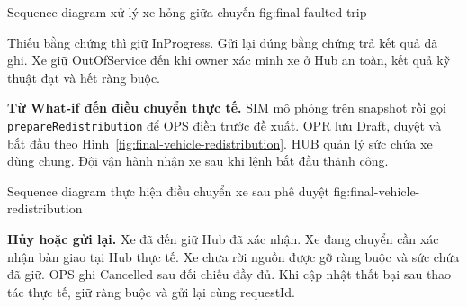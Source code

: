  {Sequence diagram xử lý xe hỏng giữa chuyến}
  {fig:final-faulted-trip}

\noindent Thiếu bằng chứng thì giữ InProgress. Gửi lại đúng bằng chứng trả kết quả đã ghi. Xe giữ OutOfService đến khi owner xác minh xe ở Hub an toàn, kết quả kỹ thuật đạt và hết ràng buộc.

\noindent\textbf{Từ What-if đến điều chuyển thực tế.} SIM mô phỏng trên snapshot rồi gọi \texttt{prepareRedistribution} để OPS điền trước đề xuất. OPR lưu Draft, duyệt và bắt đầu theo Hình~\ref{fig:final-vehicle-redistribution}. HUB quản lý sức chứa xe dùng chung. Đội vận hành nhận xe sau khi lệnh bắt đầu thành công.

  {Sequence diagram thực hiện điều chuyển xe sau phê duyệt}
  {fig:final-vehicle-redistribution}

\noindent\textbf{Hủy hoặc gửi lại.} Xe đã đến giữ Hub đã xác nhận. Xe đang chuyển cần xác nhận bàn giao tại Hub thực tế. Xe chưa rời nguồn được gỡ ràng buộc và sức chứa đã giữ. OPS ghi Cancelled sau đối chiếu đầy đủ. Khi cập nhật thất bại sau thao tác thực tế, giữ ràng buộc và gửi lại cùng requestId.

\endgroup
